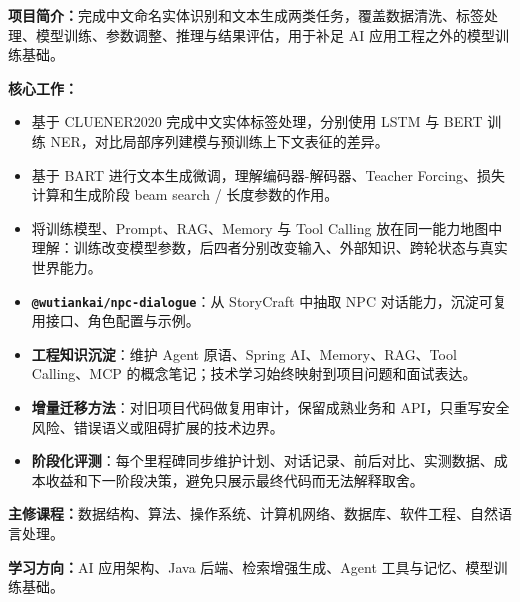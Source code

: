 
\textbf{项目简介：}完成中文命名实体识别和文本生成两类任务，覆盖数据清洗、标签处理、模型训练、参数调整、推理与结果评估，用于补足 AI 应用工程之外的模型训练基础。

\textbf{核心工作：}
\begin{itemize}[parsep=0.55ex]
  \item 基于 CLUENER2020 完成中文实体标签处理，分别使用 LSTM 与 BERT 训练 NER，对比局部序列建模与预训练上下文表征的差异。
  \item 基于 BART 进行文本生成微调，理解编码器-解码器、Teacher Forcing、损失计算和生成阶段 beam search / 长度参数的作用。
  \item 将训练模型、Prompt、RAG、Memory 与 Tool Calling 放在同一能力地图中理解：训练改变模型参数，后四者分别改变输入、外部知识、跨轮状态与真实世界能力。
\end{itemize}

\begin{itemize}[parsep=0.65ex]
  \item \textbf{\texttt{@wutiankai/npc-dialogue}}：从 StoryCraft 中抽取 NPC 对话能力，沉淀可复用接口、角色配置与示例。
  \item \textbf{工程知识沉淀}：维护 Agent 原语、Spring AI、Memory、RAG、Tool Calling、MCP 的概念笔记；技术学习始终映射到项目问题和面试表达。
  \item \textbf{增量迁移方法}：对旧项目代码做复用审计，保留成熟业务和 API，只重写安全风险、错误语义或阻碍扩展的技术边界。
  \item \textbf{阶段化评测}：每个里程碑同步维护计划、对话记录、前后对比、实测数据、成本收益和下一阶段决策，避免只展示最终代码而无法解释取舍。
\end{itemize}



\textbf{主修课程：}数据结构、算法、操作系统、计算机网络、数据库、软件工程、自然语言处理。

\textbf{学习方向：}AI 应用架构、Java 后端、检索增强生成、Agent 工具与记忆、模型训练基础。

